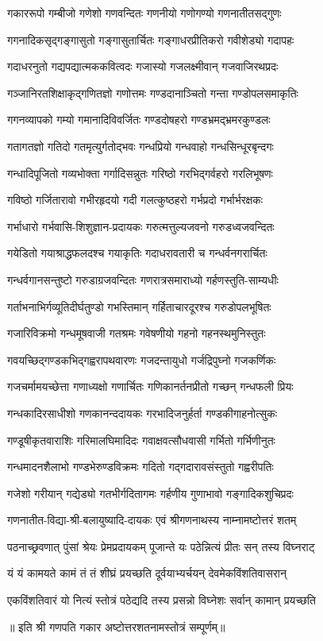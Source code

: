 

\twolineshloka
{गकाररूपो गम्बीजो गणेशो गणवन्दितः}
{गणनीयो गणोगण्यो गणनातीतसद्गुणः}%

\twolineshloka
{गगनादिकसृद्गङ्गासुतो गङ्गासुतार्चितः}
{गङ्गाधरप्रीतिकरो गवीशेड्यो गदापहः}%

\twolineshloka
{गदाधरनुतो गद्यपद्यात्मककवित्वदः}
{गजास्यो गजलक्ष्मीवान् गजवाजिरथप्रदः}%

\twolineshloka
{गञ्जानिरतशिक्षाकृद्गणितज्ञो गणोत्तमः}
{गण्डदानाञ्चितो गन्ता गण्डोपलसमाकृतिः}%

\twolineshloka
{गगनव्यापको गम्यो गमानादिविवर्जितः}
{गण्डदोषहरो गण्डभ्रमद्भ्रमरकुण्डलः}%

\twolineshloka
{गतागतज्ञो गतिदो गतमृत्युर्गतोद्भवः}
{गन्धप्रियो गन्धवाहो गन्धसिन्धूरबृन्दगः}%

\twolineshloka
{गन्धादिपूजितो गव्यभोक्ता गर्गादिसन्नुतः}
{गरिष्ठो गरभिद्गर्वहरो गरलिभूषणः}%

\twolineshloka
{गविष्ठो गर्जितारावो गभीरहृदयो गदी}
{गलत्कुष्ठहरो गर्भप्रदो गर्भार्भरक्षकः}%

\twolineshloka
{गर्भाधारो गर्भवासि-शिशुज्ञान-प्रदायकः}
{गरुत्मत्तुल्यजवनो गरुडध्वजवन्दितः}%

\twolineshloka
{गयेडितो गयाश्राद्धफलदश्च गयाकृतिः}
{गदाधरावतारी च गन्धर्वनगरार्चितः}%

\twolineshloka
{गन्धर्वगानसन्तुष्टो गरुडाग्रजवन्दितः}
{गणरात्रसमाराध्यो गर्हणस्तुति-साम्यधीः}%

\twolineshloka
{गर्ताभनाभिर्गव्यूतिदीर्घतुण्डो गभस्तिमान्}
{गर्हिताचारदूरश्च गरुडोपलभूषितः}%

\twolineshloka
{गजारिविक्रमो गन्धमूषवाजी गतश्रमः}
{गवेषणीयो गहनो गहनस्थमुनिस्तुतः}%

\twolineshloka
{गवयच्छिद्गण्डकभिद्गह्वरापथवारणः}
{गजदन्तायुधो गर्जद्रिपुघ्नो गजकर्णिकः}%

\twolineshloka
{गजचर्मामयच्छेत्ता गणाध्यक्षो गणार्चितः}%
{गणिकानर्तनप्रीतो गच्छन् गन्धफली प्रियः}%

\twolineshloka
{गन्धकादिरसाधीशो गणकानन्ददायकः}%
{गरभादिजनुर्हर्ता गण्डकीगाहनोत्सुकः}%

\twolineshloka
{गण्डूषीकृतवाराशिः गरिमालघिमादिदः}%
{गवाक्षवत्सौधवासी गर्भितो गर्भिणीनुतः}%

\twolineshloka
{गन्धमादनशैलाभो गण्डभेरुण्डविक्रमः}%
{गदितो गद्गदारावसंस्तुतो गह्वरीपतिः}%

\twolineshloka
{गजेशो गरीयान् गद्येड्यो गतभीर्गदितागमः}%
{गर्हणीय गुणाभावो गङ्गादिकशुचिप्रदः}%

\twolineshloka
{गणनातीत-विद्या-श्री-बलायुष्यादि-दायकः}%
{एवं श्रीगणनाथस्य नाम्नामष्टोत्तरं शतम्}%

\twolineshloka
{पठनाच्छ्रवणात् पुंसां श्रेयः प्रेमप्रदायकम्}%
{पूजान्ते यः पठेन्नित्यं प्रीतः सन् तस्य विघ्नराट्}%

\twolineshloka
{यं यं कामयते कामं तं तं शीघ्रं प्रयच्छति}%
{दूर्वयाभ्यर्चयन् देवमेकविंशतिवासरान्}%

\twolineshloka
{एकविंशतिवारं यो नित्यं स्तोत्रं पठेद्यदि}%
{तस्य प्रसन्नो विघ्नेशः सर्वान् कामान् प्रयच्छति}%

॥ इति श्री गणपति गकार अष्टोत्तरशतनामस्तोत्रं सम्पूर्णम्॥
